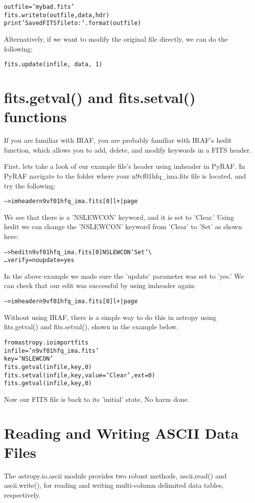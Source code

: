 \begin{alltt}
\pytab outfile = 'mybad.fits'
\pytab fits.writeto(outfile, data, hdr)
\pytab print 'Saved FITS file to: {}'.format(outfile)
\end{alltt}

Alternatively, if we want to modify the original file directly,
we can do the following:

\texttt{\pytab fits.update(infile, data, 1)}

\section{{\sf fits.getval()} and {\sf fits.setval()} functions}

If you are familiar with IRAF, you are probably familiar with IRAF's
{\sf\small hedit} function, which allows you to add, delete, and
modify keywords in a FITS header.  

First, lets take a look of our example file's header using {\sf\small
  imheader} in PyRAF.  In PyRAF navigate to the folder where your
n9vf01hfq\_ima.fits file is located, and try the following:

\begin{alltt}
--> imheader n9vf01hfq_ima.fits[0] l+ | page 
\end{alltt}

We see that there is a 'NSLEWCON' keyword, and it is set to 'Clear.'
Using {\sf\small hedit} we can change the 'NSLEWCON' keyword from
'Clear' to 'Set' as shown here:

\begin{alltt}
--> hedit n9vf01hfq_ima.fits[0] NSLEWCON 'Set'  \textbackslash
\ldots     verify=no update=yes
\end{alltt}

In the above example we made sure the 'update' parameter was set to
'yes.'  We can check that our edit was successful by using  {\sf\small
  imheader} again:

\begin{alltt}
--> imheader n9vf01hfq_ima.fits[0] l+ | page 
\end{alltt}

Without using IRAF, there is a simple way to do this in astropy using
{\sf\small fits.getval()} and {\sf\small fits.setval()}, shown in
the example below.

\begin{alltt}
\pytab from astropy.io import fits
\pytab infile = 'n9vf01hfq_ima.fits' 
\pytab key = 'NSLEWCON'
\pytab fits.getval(infile, key, 0)
\pytab fits.setval(infile, key, value='Clear', ext=0)
\pytab fits.getval(infile, key, 0)
\end{alltt}

Now our FITS file is back to its 'initial' state.  No harm done.


\section{Reading and Writing ASCII Data Files}

The astropy.io.ascii module provides two robust methods, ascii.read() and
ascii.write(), for reading and writing multi-column delimited data tables,
respectively.